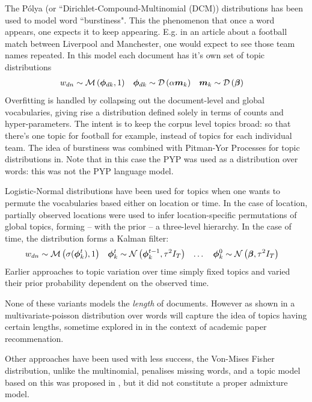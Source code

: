 The P\'olya (or ``Dirichlet-Compound-Multinomial (DCM)) distributions has been used to model word ``burstiness"\cite{Madsen2005}. This the phenomenon that once a word appears, one expects it to keep appearing. E.g. in an article about a football match between Liverpool and Manchester, one would expect to see those team names repeated. In this model each document has it's own set of topic distributions
\begin{align}
w_{dn} & \sim \mathcal{M} \left( {\bm \phi_{dk}},{1} \right) &
\bm \phi_{dk} & \sim \mathcal{D} \left( {\alpha \bm m_k} \right) &
\bm m_k & \sim \mathcal{D} \left( {\bm \beta} \right)
\end{align}
Overfitting is handled by collapsing out the document-level and global vocabularies, giving rise a distribution defined solely in terms of counts and hyper-parameters. The intent is to keep the corpus level topics broad: so that there's one topic for football for example, instead of topics for each individual team. The idea of burstiness was combined with Pitman-Yor Processes for topic distributions in\cite{Buntine2014}. Note that in this case the PYP was used as a distribution over words: this was not the PYP language model.

Logistic-Normal distributions have been used for topics when one wants to permute the vocabularies based either on location \cite{Eisenstein2010} or time\cite{Blei2006a}. In the case of location, partially observed locations were used to infer location-specific permutations of global topics, forming -- with the prior -- a three-level hierarchy. In the case of time, the distribution forms a Kalman filter:
\begin{align}
w_{dn} & \sim \mathcal{M} \left( {\sigma(\bm \phi_k^t)},{1} \right) &
\bm \phi_k^t & \sim \mathcal{N} \left( {\bm \phi_k^{t-1}}, {\tau^2 I_T} \right) & \ldots\quad
\bm \phi_k^0 & \sim \mathcal{N} \left( {\bm \beta}, {\tau^2 I_T} \right)
\end{align}
Earlier approaches to topic variation over time simply fixed topics and varied their prior probability dependent on the observed time\cite{Wang2006}. 
 
None of these variants models the \emph{length} of documents. However as shown in  a multivariate-poisson distribution over words will capture the idea of topics having certain lengths, sometime explored in\cite{Gopalan2013} in the context of academic paper recommenation.

Other approaches have been used with less success, the Von-Mises Fisher distribution, unlike the multinomial, penalises missing words, and a topic model based on this was proposed in \cite{Reisinger2010}, but it did not constitute a proper admixture model.

